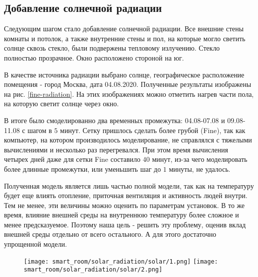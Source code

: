 \newpage


\subsection{Добавление солнечной радиации}

Следующим шагом стало добавление солнечной радиации.
Все внешние стены комнаты и потолок, а также внутренние стены и пол, на которые могло светить солнце сквозь стекло, были подвержены тепловому излучению. Стекло полностью прозрачное. Окно расположено стороной на юг.

В качестве источника радиации выбрано солнце, географическое расположение помещения - город Москва, дата 04.08.2020.
Полученные результаты изображены на рис. \ref{fine-radiation}. На этих изображениях можно отметить нагрев части пола, на которую светит солнце через окно.

В итоге было смоделированно два временных промежутка: 04.08-07.08 и 09.08-11.08 с шагом в $5$ минут. Сетку пришлось сделать более грубой (Fine), так как компьютер, на котором производилось моделирование, не справлялся с тяжелыми вычислениями и несколько раз перегревался. При этом время вычисления четырех дней даже для сетки Fine составило $40$ минут, из-за чего моделировать более длинные промежутки, или уменьшить шаг до $1$ минуты, не удалось. 

Полученная модель является лишь частью полной модели, так как на температуру будет еще влиять отопление, приточная вентиляция и активность людей внутри. Тем не менее, эти величины можно оценить по параметрам установок. В то же время, влияние внешней среды на внутреннюю температуру более сложное и менее предсказуемое. Поэтому наша цель - решить эту проблему, оценив вклад внешней среды отдельно от всего остального. А для этого достаточно упрощенной модели.

\begin{figure}[H]
\texttt{[image: smart\_room/solar\_radiation/solar/1.png]}\hfill
\texttt{[image: smart\_room/solar\_radiation/solar/2.png]}\hfill
\end{figure}


